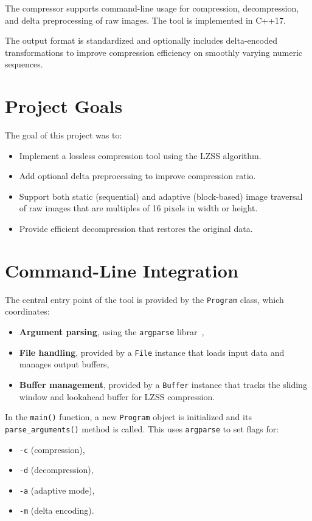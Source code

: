 \documentclass[a4paper,12pt]{article}
\begin{document}
    The compressor supports command-line usage for compression, decompression, and delta preprocessing of raw
    images. The tool is implemented in C++17.

    The output format is standardized and optionally includes delta-encoded transformations to improve compression efficiency on smoothly varying numeric sequences.



    \section{Project Goals}
    The goal of this project was to:
    \begin{itemize}
        \item Implement a lossless compression tool using the LZSS algorithm.
        \item Add optional delta preprocessing to improve compression ratio.
        \item Support both static (sequential) and adaptive (block-based) image traversal of raw images that are
        multiples of 16 pixels in width or height.
        \item Provide efficient decompression that restores the original data.
    \end{itemize}


    \section{Command-Line Integration}

    The central entry point of the tool is provided by the \texttt{Program} class, which coordinates:
    \begin{itemize}
        \item \textbf{Argument parsing}, using the \texttt{argparse} librar~\cite{argparse_repo},
        \item \textbf{File handling}, provided by a \texttt{File} instance that loads input data and manages output buffers,
        \item \textbf{Buffer management}, provided by a \texttt{Buffer} instance that tracks the sliding window and lookahead buffer for LZSS compression.
    \end{itemize}

    In the \texttt{main()} function, a new \texttt{Program} object is initialized and its \texttt{parse\_arguments()} method is called. This uses \texttt{argparse} to set flags for:
    \begin{itemize}
        \item \texttt{-c} (compression),
        \item \texttt{-d} (decompression),
        \item \texttt{-a} (adaptive mode),
        \item \texttt{-m} (delta encoding).
    \end{itemize}
\end{document}
